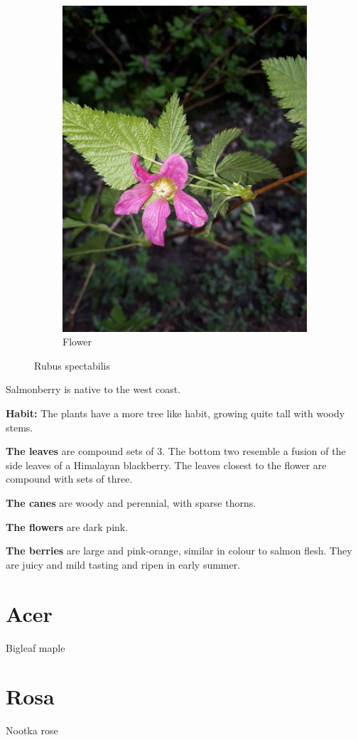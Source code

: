 \begin{figure}
\begin{subfigure}{0.48\textwidth}
    \includegraphics[width=\textwidth]{rubus/spectabilis_flower_01}
    \caption{Flower}
    \label{fig:rub:spectabilis:berry}
\end{subfigure}

        
\caption{Rubus spectabilis}
\label{fig:rub:spectabilis}
\end{figure}

Salmonberry is native to the west coast.

\textbf{Habit:} The plants have a more tree like habit, growing quite tall with woody stems.

\textbf{The leaves} are compound sets of 3. The bottom two resemble a fusion of the side leaves of a Himalayan blackberry. The leaves closest to the flower are compound with sets of three.

\textbf{The canes} are woody and perennial, with sparse thorns.

\textbf{The flowers} are dark pink.

\textbf{The berries} are large and pink-orange, similar in colour to salmon flesh. They are juicy and mild tasting and ripen in early summer.


\section{Acer}

Bigleaf maple

\section{Rosa}

Nootka rose

